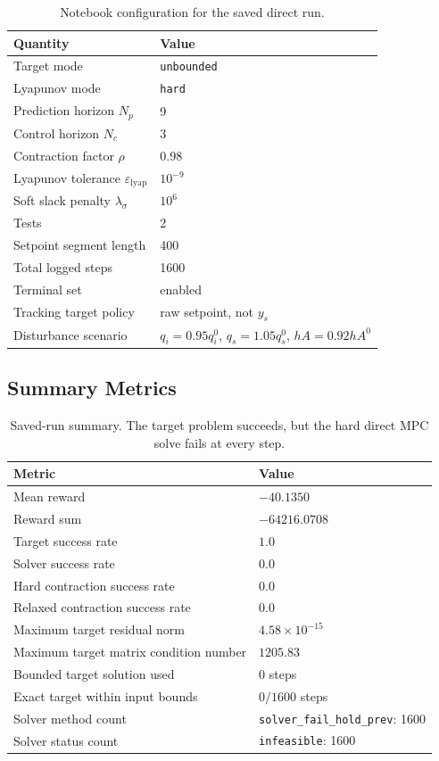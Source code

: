 \documentclass[11pt]{article}
\begin{document}
\begin{table}[H]
\centering
\caption{Notebook configuration for the saved direct run.}
\begin{tabular}{ll}
\toprule
Quantity & Value \\
\midrule
Target mode & \texttt{unbounded} \\
Lyapunov mode & \texttt{hard} \\
Prediction horizon \(N_p\) & 9 \\
Control horizon \(N_c\) & 3 \\
Contraction factor \(\rho\) & 0.98 \\
Lyapunov tolerance \(\varepsilon_{\mathrm{lyap}}\) & \(10^{-9}\) \\
Soft slack penalty \(\lambda_\sigma\) & \(10^6\) \\
Tests & 2 \\
Setpoint segment length & 400 \\
Total logged steps & 1600 \\
Terminal set & enabled \\
Tracking target policy & raw setpoint, not \(y_s\) \\
Disturbance scenario & \(q_i=0.95q_i^0\), \(q_s=1.05q_s^0\), \(hA=0.92hA^0\) \\
\bottomrule
\end{tabular}
\end{table}

\subsection{Summary Metrics}

\begin{table}[H]
\centering
\caption{Saved-run summary. The target problem succeeds, but the hard direct MPC solve fails at every step.}
\begin{tabular}{ll}
\toprule
Metric & Value \\
\midrule
Mean reward & \(-40.1350\) \\
Reward sum & \(-64216.0708\) \\
Target success rate & \(1.0\) \\
Solver success rate & \(0.0\) \\
Hard contraction success rate & \(0.0\) \\
Relaxed contraction success rate & \(0.0\) \\
Maximum target residual norm & \(4.58\times 10^{-15}\) \\
Maximum target matrix condition number & \(1205.83\) \\
Bounded target solution used & \(0\) steps \\
Exact target within input bounds & \(0/1600\) steps \\
Solver method count & \texttt{solver\_fail\_hold\_prev}: 1600 \\
Solver status count & \texttt{infeasible}: 1600 \\
\bottomrule
\end{tabular}
\end{table}
\end{document}
